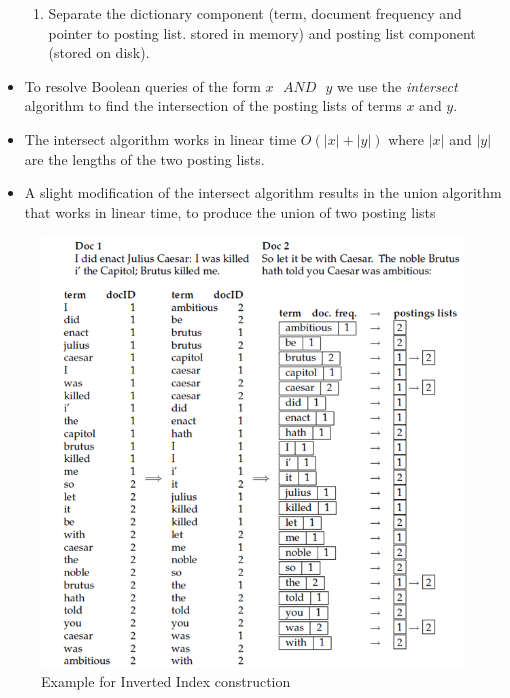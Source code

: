 \documentclass{article}
\begin{document}
\begin{itemize}
\begin{enumerate}
        \item Separate the dictionary component (term, document frequency and pointer to posting list. stored in memory) and posting list component (stored on disk).
    \end{enumerate}
    
    \item To resolve Boolean queries of the form $x\text{ }AND\text{ }y$ we use the \textit{intersect} algorithm to find the intersection of the posting lists of terms $x$ and $y$.
    
    \item The intersect algorithm works in linear time $O(|x| + |y|)$ where $|x|$ and $|y|$ are the lengths of the two posting lists. 
    
    \item A slight modification of the intersect algorithm results in the union algorithm that works in linear time, to produce the union of two posting lists

\end{itemize}

\begin{figure}[!t]
    \centering
    \includegraphics[scale=0.9]{ir.png}
    \caption{Example for Inverted Index construction}
    \label{fig:my_label}
\end{figure}
\end{document}
